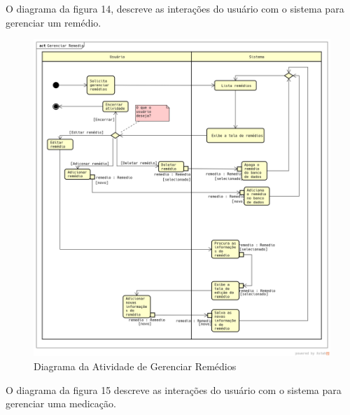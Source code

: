 \documentclass[12pt]{article}
\begin{document}
\begin{titlepage}
\begin{center}
\newpage

O diagrama da figura 14, descreve as interações do usuário com o sistema para gerenciar um remédio.
\begin{figure}[!h]
	\begin{center}
		\caption{Diagrama da Atividade de Gerenciar Remédios}
		\includegraphics[width=6in]{img/atividaderemedio.png}

	\end{center}
\end{figure}

\newpage

O diagrama da figura 15 descreve as interações do usuário com o sistema para gerenciar uma medicação.


\end{center}
\end{titlepage}
\end{document}
